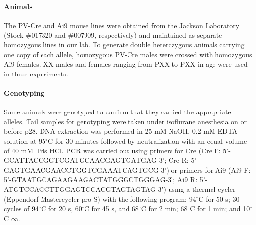 \paragraph{Animals} The PV-Cre and Ai9 mouse lines were obtained from the Jackson Laboratory (Stock \#017320 and \#007909, respectively) and maintained as separate homozygous lines in our lab.  To generate double heterozygous animals carrying one copy of each allele, homozygous PV-Cre males were crossed with homozygous Ai9 females. XX males and females ranging from PXX to PXX in age were used in these experiments. 

\paragraph{Genotyping} Some animals were genotyped to confirm that they carried the appropriate alleles. Tail samples for genotyping were taken under isoflurane anesthesia on or before p28.  DNA extraction was performed in 25 mM NaOH, 0.2 mM EDTA solution at 95$^\circ$C for 30 minutes followed by neutralization with an equal volume of 40 mM Tris HCl.  PCR was carried out using primers for Cre (Cre F: 5'-GCATTA\-CCG\-GTC\-GAT\-GCA\-ACG\-AGT\-GATGAG-3'; Cre R: 5'-GAGTGA\-ACG\-AAC\-CTG\-GTC\-GAA\-ATC\-AGTGCG-3') or primers for Ai9 (Ai9 F: 5'-GTAATG\-CAG\-AAG\-AAG\-ACT\-ATG\-GGC\-TGGGAG-3'; Ai9 R: 5'-ATGTCC\-AGC\-TTG\-GAG\-TCC\-ACG\-TAG\-TAGTAG-3') using a thermal cycler (Eppendorf Mastercycler pro S) with the following program: 94$^\circ$C for 50 s; 30 cycles of 94$^\circ$C for 20 s, 60$^\circ$C for 45 s, and 68$^\circ$C for 2 min; 68$^\circ$C for 1 min; and 10$^\circ$C $\infty$.

